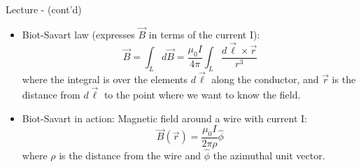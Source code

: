 %
%
%
\begin{frame}{Lecture \summarizedlecture - \lecturesummarytitle (cont'd)}

\begin{itemize}

\item Biot-Savart law (expresses $\vec{B}$ in terms of the current I):
     \begin{equation*}
            \vec{B} = \int_{L} d\vec{B}
                        = \frac{\mu_0I}{4\pi} \int_{L} \frac{d\vec{\ell} \times \vec{r}}{r^3}
     \end{equation*}
          where the integral is over the elements $d\vec{\ell}$ along the conductor, and $\vec{r}$
          is the distance from $d\vec{\ell}$ to the point where we want to know the field.

\vspace{0.2cm}

\item Biot-Savart in action: Magnetic field around a wire with current I:
     \begin{equation*}
           \vec{B}(\vec{r}) = \frac{\mu_0I}{2\pi \rho} \hat\phi
     \end{equation*}
         where $\rho$ is the distance from the wire and $\hat\phi$ the azimuthal unit vector.
\end{itemize}

\end{frame}

